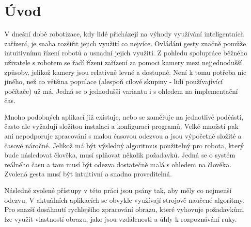 \chapter{Úvod}
V dnešní době robotizace, kdy lidé přicházejí na výhody využívání inteligentních zařízení, je snaha rozšířit jejich využití co nejvíce. Ovládání gesty značně pomůže intuitivnímu řízení robotů a usnadní jejich využití.
Z pohledu spolupráce běžného uživatele s robotem se řadí řízení zařízení za pomoci kamery mezi nejjednodušší způsoby, jelikož kamery jsou relativně levné a dostupné. Není k tomu potřeba nic jiného, než co většina populace (alespoň cílové skupiny - lidí používajívící počítače) už má. Jedná se o jednodušší variantu i s ohledem na implementační čas.

Mnoho podobných aplikací již existuje, nebo se zaměřuje na jednotlivé podčásti, často ale vyžadují složitou instalaci a konfiguraci programů. Velké množstí pak ani nepodporuje zpracování s malou časovou odezvou a jsou výpočetně složité a časové náročné.
Jelikož má být výsledný algoritmus použitelný pro robota, který  bude  následovat člověka, musí splňovat několik požadavků. Jedná se o systém reálného času a tam musí být odezva dostatečně malá s ohledem na člověka. Zvolená gesta musí být intuitivní a snadno proveditelná. 		%

Následně zvolené přístupy v této práci jsou psány tak, aby měly co nejmenší odezvu. 
V aktuálních aplikacích se obvykle využívají strojově naučené algoritmy. Pro snazší dosáhnutí rychlejšího zpracování obrazu, které vyhovuje požadavkům, lze využít vlastností obrazu, jako jsou vzdálenosti a úhly k rozpoznávání ruky.



\endinput